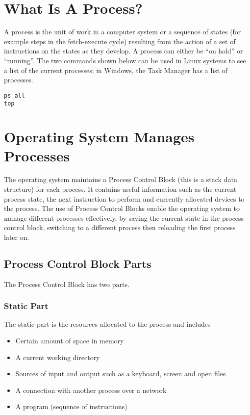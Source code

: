 
\section{What Is A Process?}
A process is the unit of work in a computer system or a sequence of states (for example steps in the fetch-execute cycle) resulting from the action of a set of instructions on the states as they develop. A process can either be ``on hold'' or ``running''. The two commands shown below can be used in Linux systems to see a list of the current processes; in Windows, the Task Manager has a list of processes.
\begin{verbatim}
ps all
top
\end{verbatim}

\section{Operating System Manages Processes}
The operating system maintains a Process Control Block (this is a stack data structure) for each process. It contains useful information such as the current process state, the next instruction to perform and currently allocated devices to the process. The use of Process Control Blocks enable the operating system to manage different processes effectively, by saving the current state in the process control block, switching to a different process then reloading the first process later on.

\subsection{Process Control Block Parts}
The Process Control Block has two parts.
\subsubsection{Static Part}
The static part is the resources allocated to the process and includes
\begin{itemize}
    \item Certain amount of space in memory
    \item A current working directory
    \item Sources of input and output such as a keyboard, screen and open files
    \item A connection with another process over a network
    \item A program (sequence of instructions)
\end{itemize}
